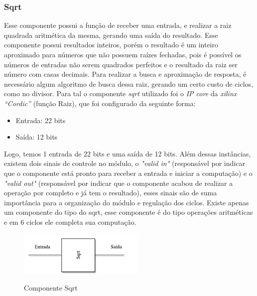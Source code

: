 \subsubsection{Sqrt}
Esse componente possui a função de receber uma entrada, e realizar a raiz quadrada aritmética da mesma, gerando uma saída do resultado. Esse componente possui resultados inteiros, porém o resultado é um inteiro aproximado para números que não possuem raízes fechadas, pois é possível os números de entradas não serem quadrados perfeitos e o resultado da raiz ser número com casas decimais. Para realizar a busca e aproximação de resposta, é necessário algum algoritmo de busca dessa raiz, gerando um certo custo de ciclos, como no divisor. Para tal o componente \textit{sqrt} utilizado foi o \textit{IP core} da \textit{xilinx “Cordic”} (função Raiz), que foi configurado da seguinte forma: 
\begin{itemize}
	\item Entrada: 22 bits
	\item Saída: 12 bits
\end{itemize}
Logo, temos 1 entrada de 22 bits e uma saída de 12 bits. Além dessas instâncias, existem dois sinais de controle no módulo, o \textit{"valid in"} (responsável por indicar que o componente está pronto para receber a entrada e iniciar a computação) e o \textit{"valid out"} (responsável por indicar que o componente acabou de realizar a operação por completo e já tem o resultado), esses sinais são de suma importância para a organização do módulo e regulação dos ciclos. Existe apenas um componente do tipo do sqrt, esse componente é do tipo operações aritméticas e em 6 ciclos ele completa sua computação.

\begin{figure}[H]
	\centering
	\includegraphics[width=6cm]{figures/sqrt.pdf}\\
	\caption{Componente Sqrt}
	\label{Sqrt}
\end{figure}

